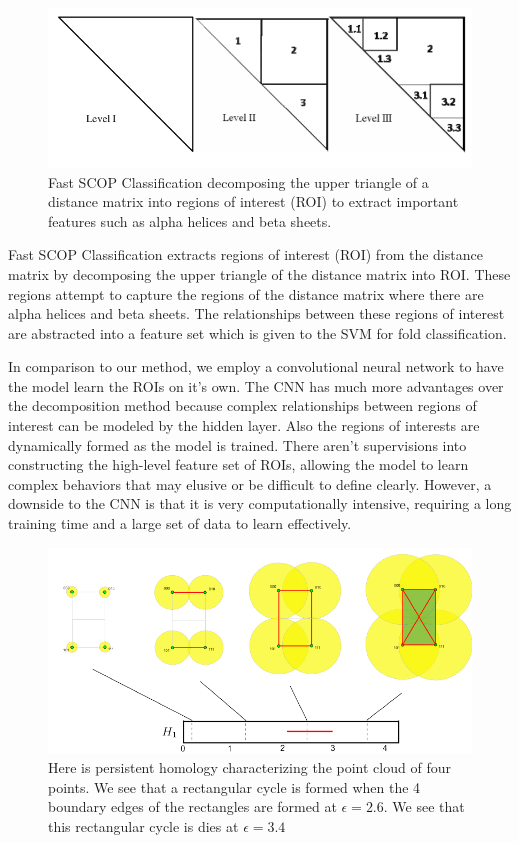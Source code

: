 \documentclass[12pt, a4paper, twocolumn, fullpage]{article}
\theoremstyle{plain}
\theoremstyle{definition}
\theoremstyle{remark}
\begin{document}
\begin{figure}
	\centering
    \includegraphics[width=.9\linewidth]{img/fastSCOP/ROIdecomp.png}
    \caption{Fast SCOP Classification decomposing the upper triangle of a distance matrix into regions of interest (ROI) to extract important features such as alpha helices and beta sheets.}
    \label{}
\end{figure}


Fast SCOP Classification extracts regions of interest (ROI) from the distance matrix by decomposing the upper triangle of the distance matrix into ROI. These regions attempt to capture the regions of the distance matrix where there are alpha helices and beta sheets. The relationships between these regions of interest are abstracted into a feature set which is given to the SVM for fold classification.

In comparison to our method, we employ a convolutional neural network to have the model learn the ROIs on it's own. The CNN has much more advantages over the decomposition method because complex relationships between regions of interest can be modeled by the hidden layer. Also the regions of interests are dynamically formed as the model is trained. There aren't supervisions into constructing the high-level feature set of ROIs, allowing the model to learn complex behaviors that may elusive or be difficult to define clearly. However, a downside to the CNN is that it is very computationally intensive, requiring a long training time and a large set of data to learn effectively. \\

\begin{figure}
	\centering
    \includegraphics[width=\linewidth]{img/hom/persistentHomEx.png}
    \caption{Here is persistent homology characterizing the point cloud of four points. We see that a rectangular cycle is formed when the 4 boundary edges of the rectangles are formed at $\epsilon = 2.6$. We see that this rectangular cycle is dies at   $\epsilon = 3.4$}
    \label{fig:persistentHomEx}
\end{figure}
\end{document}
